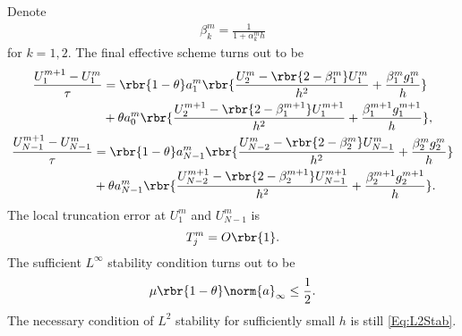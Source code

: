 \documentclass[english, nochinese]{pnote}
\begin{document}
Denote
\begin{gather}
\beta_k^m = \frac{1}{ 1 + \alpha_k^m h }
\end{gather}
for $ k = 1, 2 $. The final effective scheme turns out to be
\begin{gather}
\begin{split}
\frac{ U_1^{ m + 1 } - U_1^m }{\tau} &= \rbr{ 1 - \theta } a_1^m \rbr{ \frac{ U_2^m - \rbr{ 2 - \beta_1^m } U_1^m }{h^2} + \frac{ \beta_1^m g_1^m }{h} } \\
&+ \theta a_0^m \rbr{ \frac{ U_2^{ m + 1 } - \rbr{ 2 - \beta_1^{ m + 1 } } U_1^{ m + 1 } }{h^2} + \frac{ \beta_1^{ m + 1 } g_1^{ m + 1 } }{h} },
\end{split}
\\
\begin{split}
\frac{ U_{ N - 1 }^{ m + 1 } - U_{ N - 1 }^m }{\tau} &= \rbr{ 1 - \theta } a_{ N - 1 }^m \rbr{ \frac{ U_{ N - 2 }^m - \rbr{ 2 - \beta_2^m } U_{ N - 1 }^m }{h^2} + \frac{ \beta_2^m g_2^m }{h} } \\
&+ \theta a_{ N - 1 }^m \rbr{ \frac{ U_{ N - 2 }^{ m + 1 } - \rbr{ 2 - \beta_2^{ m + 1 } } U_{ N - 1 }^{ m + 1 } }{h^2} + \frac{ \beta_2^{ m + 1 } g_2^{ m + 1 } }{h} }.
\end{split}
\end{gather}
The local truncation error at $U_1^m$ and $ U_{ N - 1 }^m $ is
\begin{equation}
T_j^m = O \rbr{1}.
\end{equation}
The sufficient $L^{\infty}$ stability condition turns out to be
\begin{equation} \label{Eq:LIStab}
\mu \rbr{ 1 - \theta } \norm{a}_{\infty} \le \frac{1}{2}.
\end{equation}
The necessary condition of $L^2$ stability for sufficiently small $h$ is still \eqref{Eq:L2Stab}.
\end{document}
